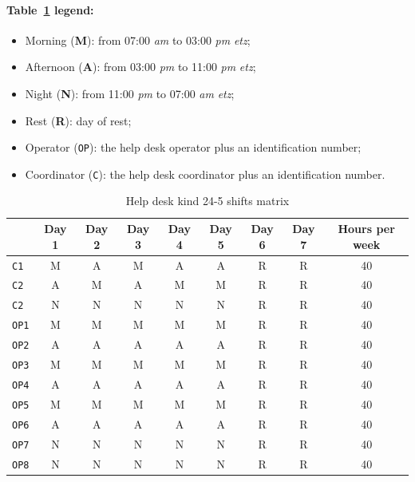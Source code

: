 \paragraph{Table~\ref{tab:shifts_24_5} legend:}
\begin{itemize}
	\item Morning (\textbf{M}): from 07:00 \textit{\gls{am}} to 03:00 \textit{\gls{pm}} \textit{\gls{etz}};
	\item Afternoon (\textbf{A}): from 03:00 \textit{\gls{pm}} to 11:00 \textit{\gls{pm}} \textit{\gls{etz}};
	\item Night (\textbf{N}): from 11:00 \textit{\gls{pm}} to 07:00 \textit{\gls{am}} \textit{\gls{etz}};
	\item Rest (\textbf{R}): day of rest;
	\item Operator (\texttt{OP}): the help desk operator plus an identification number;
	\item Coordinator (\texttt{C}): the help desk coordinator plus an identification number.
\end{itemize}

\begin{table}[H]
	\centering
	\begin{tabular}{|l|c|c|c|c|c|c|c|c|} 
		\hline
		& \textbf{Day 1} & \textbf{Day 2} & \textbf{Day 3} & \textbf{Day 4} & \textbf{Day 5} & \textbf{Day 6} & \textbf{Day 7} & \textbf{Hours per week}\\ 
		\hline
		\texttt{C1} & M & A & M & A & A & R & R & 40\\
		\hline
		\texttt{C2} & A & M & A & M & M & R & R & 40\\
		\hline
		\texttt{C2} & N & N & N & N & N & R & R & 40\\
		\hline
		\texttt{OP1} & M & M & M & M & M & R & R & 40\\
		\hline
		\texttt{OP2} & A & A & A & A & A & R & R & 40\\
		\hline
		\texttt{OP3} & M & M & M & M & M & R & R & 40\\
		\hline
		\texttt{OP4} & A & A & A & A & A & R & R & 40\\
		\hline
		\texttt{OP5} & M & M & M & M & M & R & R & 40\\
		\hline
		\texttt{OP6} & A & A & A & A & A & R & R & 40\\
		\hline
		\texttt{OP7} & N & N & N & N & N & R & R & 40\\
		\hline
		\texttt{OP8} & N & N & N & N & N & R & R & 40\\
		\hline
	\end{tabular}
	\caption{Help desk kind 24{-}5 shifts matrix}\label{tab:shifts_24_5}
\end{table}

